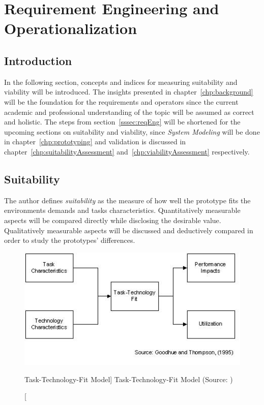 
\chapter{Requirement Engineering and Operationalization}\label{chp:operationalization}

\section{Introduction}

In the following section, concepts and indices for measuring suitability and viability will be introduced. The insights presented in chapter~\vref{chp:background} will be the foundation for the requirements and operators since the current academic and professional understanding of the topic will be assumed as correct and holistic. The steps from section~\vref{sssec:reqEng} will be shortened for the upcoming sections on suitability and viability, since \textit{System Modeling} will be done in chapter~\vref{chp:prototyping} and validation is discussed in chapter~\vref{chp:suitabilityAssessment} and~\vref{chp:viabilityAssessment} respectively.  

\section{Suitability}

The author defines \textit{suitability} as the measure of how well the prototype fits the environments demands and tasks characteristics. Quantitatively measurable aspects will be compared directly while disclosing the desirable value. Qualitatively measurable aspects will be discussed and deductively compared in order to study the prototypes' differences. 

\begin{figure}[ht]
    \includegraphics[width=0.7\linewidth]{images/methodology/ttf.jpg}\centering
    \caption
    [Task-Technology-Fit Model]
    {Task-Technology-Fit Model (Source: \cite{Goodhue1995Task-TechnologyPerformance})}
\end{figure}

